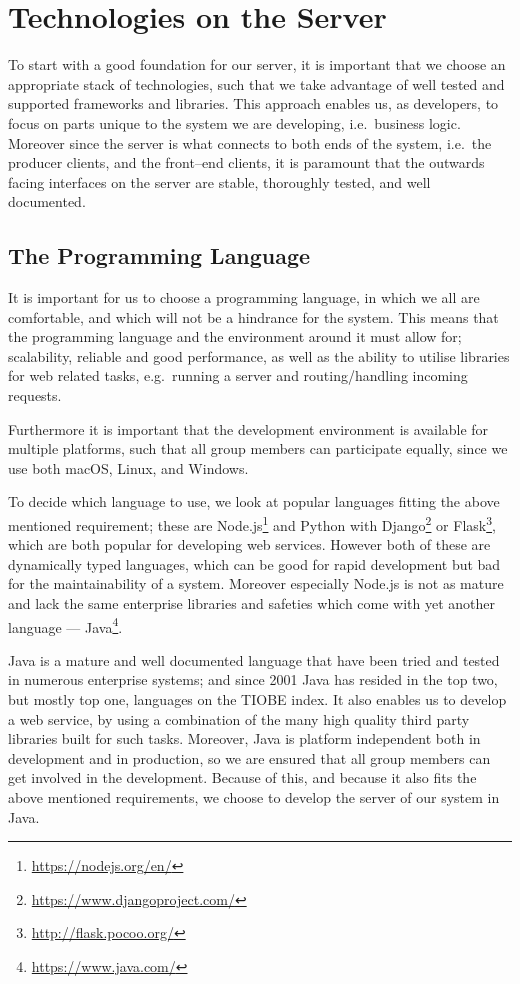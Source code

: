 \chapter{Technologies on the Server}
To start with a good foundation for our server, it is important that we choose an appropriate stack of technologies, such that we take advantage of well tested and supported frameworks and libraries.
This approach enables us, as developers, to focus on parts unique to the system we are developing, i.e.~business logic.
Moreover since the server is what connects to both ends of the system, i.e.~the producer clients, and the front--end clients, it is paramount that the outwards facing interfaces on the server are stable, thoroughly tested, and well documented.

\section{The Programming Language}
It is important for us to choose a programming language, in which we all are comfortable, and which will not be a hindrance for the system.
This means that the programming language and the environment around it must allow for; scalability, reliable and good performance, as well as the ability to utilise libraries for web related tasks, e.g.~running a server and routing/handling incoming requests.

Furthermore it is important that the development environment is available for multiple platforms, such that all group members can participate equally, since we use both macOS, Linux, and Windows.

\bigskip
To decide which language to use, we look at popular languages fitting the above mentioned requirement;
these are Node.js\footnote{\url{https://nodejs.org/en/}} and Python with Django\footnote{\url{https://www.djangoproject.com/}} or Flask\footnote{\url{http://flask.pocoo.org/}}, which are both popular for developing web services.
However both of these are dynamically typed languages, which can be good for rapid development but bad for the maintainability of a system\cite{kleinschmager2012static}.
Moreover especially Node.js is not as mature and lack the same enterprise libraries and safeties which come with yet another language --- Java\footnote{\url{https://www.java.com/}}.

Java is a mature and well documented language that have been tried and tested in numerous enterprise systems; and since 2001 Java has resided in the top two, but mostly top one, languages on the TIOBE index\cite{TiobeIndex}.
It also enables us to develop a web service, by using a combination of the many high quality third party libraries built for such tasks.
Moreover, Java is platform independent both in development and in production, so we are ensured that all group members can get involved in the development.
Because of this, and because it also fits the above mentioned requirements, we choose to develop the server of our system in Java.

